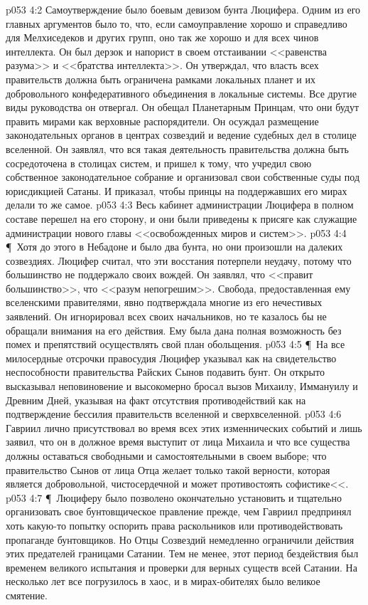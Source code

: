 \vs p053 4:2 Самоутверждение было боевым девизом бунта Люцифера. Одним из его главных аргументов было то, что, если самоуправление хорошо и справедливо для Мелхиседеков и других групп, оно так же хорошо и для всех чинов интеллекта. Он был дерзок и напорист в своем отстаивании <<равенства разума>> и <<братства интеллекта>>. Он утверждал, что власть всех правительств должна быть ограничена рамками локальных планет и их добровольного конфедеративного объединения в локальные системы. Все другие виды руководства он отвергал. Он обещал Планетарным Принцам, что они будут править мирами как верховные распорядители. Он осуждал размещение законодательных органов в центрах созвездий и ведение судебных дел в столице вселенной. Он заявлял, что вся такая деятельность правительства должна быть сосредоточена в столицах систем, и пришел к тому, что учредил свою собственное законодательное собрание и организовал свои собственные суды под юрисдикцией Сатаны. И приказал, чтобы принцы на поддержавших его мирах делали то же самое.
\vs p053 4:3 Весь кабинет администрации Люцифера в полном составе перешел на его сторону, и они были приведены к присяге как служащие администрации нового главы <<освобожденных миров и систем>>.
\vs p053 4:4 \P\ Хотя до этого в Небадоне и было два бунта, но они произошли на далеких созвездиях. Люцифер считал, что эти восстания потерпели неудачу, потому что большинство не поддержало своих вождей. Он заявлял, что <<правит большинство>>, что <<разум непогрешим>>. Свобода, предоставленная ему вселенскими правителями, явно подтверждала многие из его нечестивых заявлений. Он игнорировал всех своих начальников, но те казалось бы не обращали внимания на его действия. Ему была дана полная возможность без помех и препятствий осуществлять свой план обольщения.
\vs p053 4:5 \P\ На все милосердные отсрочки правосудия Люцифер указывал как на свидетельство неспособности правительства Райских Сынов подавить бунт. Он открыто высказывал неповиновение и высокомерно бросал вызов Михаилу, Иммануилу и Древним Дней, указывая на факт отсутствия противодействий как на подтверждение бессилия правительств вселенной и сверхвселенной.
\vs p053 4:6 Гавриил лично присутствовал во время всех этих изменнических событий и лишь заявил, что он в должное время выступит от лица Михаила и что все существа должны оставаться свободными и самостоятельными в своем выборе; что правительство Сынов от лица Отца желает только такой верности, которая является добровольной, чистосердечной и может противостоять софистике<<.
\vs p053 4:7 \P\ Люциферу было позволено окончательно установить и тщательно организовать свое бунтовщическое правление прежде, чем Гавриил предпринял хоть какую\hyp{}то попытку оспорить права раскольников или противодействовать пропаганде бунтовщиков. Но Отцы Созвездий немедленно ограничили действия этих предателей границами Сатании. Тем не менее, этот период бездействия был временем великого испытания и проверки для верных существ всей Сатании. На несколько лет все погрузилось в хаос, и в мирах\hyp{}обителях было великое смятение.
